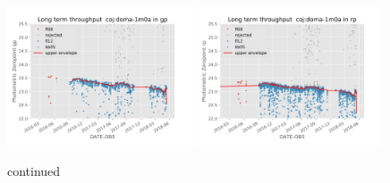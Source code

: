 \documentclass[draft]{spieman}
\begin{document}
\begin{figure}
\includegraphics[width=0.49\textwidth]{images/photzptrend-coj-doma-1m0a-gp.png} \hspace*{\fill}
\includegraphics[width=0.49\textwidth]{images/photzptrend-coj-doma-1m0a-rp.png} \\[1ex]
\caption {continued}
\end{figure}
\end{document}

